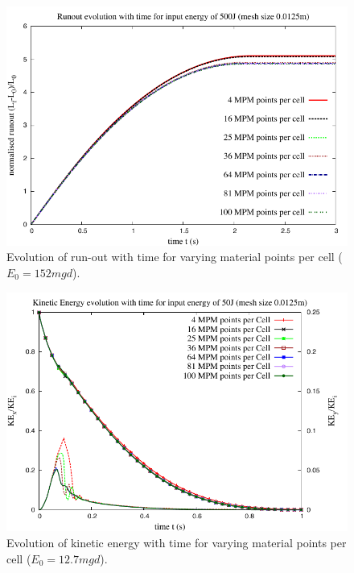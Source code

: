 \begin{figure}[tbhp]
\centering
\includegraphics[width=\textwidth]{Runout_500}
\caption{Evolution of run-out with time for varying material points per cell ($E_0=152mgd$).}
\label{fig:Runout_500}
\end{figure}

\begin{figure}[tbhp]
\centering
\includegraphics[width=\textwidth]{KE_50}
\caption{Evolution of kinetic energy with time for varying material points per cell ($E_0=12.7mgd$).}
\label{fig:KE_50}
\end{figure}

